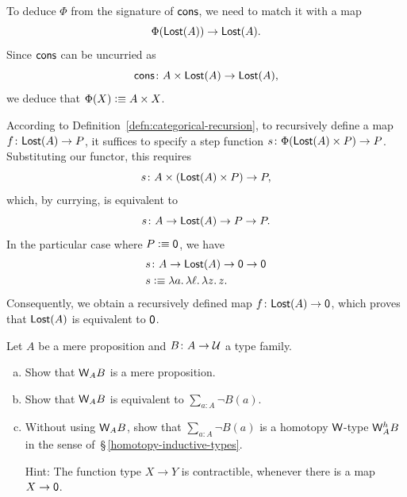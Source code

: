 \begin{solution}
    To deduce $\Phi$ from the signature of $\mathsf{cons}$, we need to match it with a map
    \[
        \Phi(\mathsf{Lost}(A))\to\mathsf{Lost}(A).
    \]
    Since $\mathsf{cons}$ can be uncurried as 
    \[
        \fun{cons}\colon
            A\times\fun{Lost}(A)\to\fun{Lost}(A),
    \]
    we deduce that $\Phi(X)\mathrel{\vcentcolon}\equiv A\times X$.
    
    According to Definition~\ref{defn:categorical-recursion}, to recursively define a map $f\colon\fun{Lost}(A)\to P$, it suffices to specify a step function $s\colon\Phi(\fun{Lost}(A)\times P)\to P$. Substituting our functor, this requires
    \[
        s\colon A\times(\fun{Lost}(A)\times P)\to P,
    \]
    which, by currying, is equivalent to
    \[
        s\colon A\to\fun{Lost}(A)\to P\to P.
    \]
    In the particular case where $P\mathrel{\vcentcolon}\equiv\mathsf{0}$, we have
    \begin{align*}
        s&\colon A\to\fun{Lost}(A)\to\fun0\to\fun0\\
        s&\defeq
            \lambda a.\,
            \lambda\ell.\,
            \lambda z.\,z.
    \end{align*}
    Consequently, we obtain a recursively defined map $f\colon\fun{Lost}(A)\to\fun0$, which proves that $\mathsf{Lost}(A)$ is equivalent to $\mathsf{0}$.
\end{solution}

\begin{exr}
    Let\/ $A$ be a mere proposition and\/ $B\colon A\to\univ$ a type family.
    \begin{enumerate}[a),font=\upshape]
        \item Show that\/ $\mathsf{W}_AB$ is a mere proposition.
        \item Show that\/ $\mathsf{W}_AB$ is equivalent to\/ $\sum_{a\colon A}\neg B(a)$.
        \item Without using\/ $\mathsf{W}_AB$, show that\/ $\sum_{a\colon A}\neg B(a)$ is a homotopy\/ $\mathsf{W}$-type\/ $\mathsf{W}^h_AB$ in the sense of\/~{\upshape\S\,\ref{homotopy-inductive-types}}.
        
        {\upshape Hint: The function type $X\to Y$ is contractible, whenever there is a map $X\to\mathsf{0}$.}
    \end{enumerate}
\end{exr}

